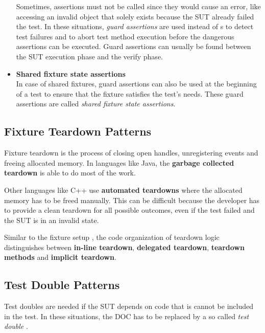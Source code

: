 \begin{itemize}
                        Sometimes, assertions must not be called since they would cause an error, like accessing an invalid object that solely exists because the SUT already failed the test.
                        In these situations, \textit{guard assertions} are used instead of s to detect test failures and to abort test method execution before the dangerous assertions can be executed. 
                        Guard assertions can usually be found between the SUT execution phase and the verify phase. 
                \item \textbf{Shared fixture state assertions}\\
                        In case of shared fixtures, guard assertions can also be used at the beginning of a test to ensure that the fixture satisfies the test's needs.
                        These guard assertions are called \textit{shared fixture state assertions}.
            \end{itemize}

    \subsection{Fixture Teardown Patterns} \label{subsec:FixtureTeardownPatterns}
        Fixture teardown is the process of closing open handles, unregistering events and freeing allocated memory.
        In languages like Java, the \textbf{garbage collected teardown} is able to do most of the work.

        Other languages like C++ use \textbf{automated teardowns} where the allocated memory has to be freed manually.
        This can be difficult because the developer has to provide a clean teardown for all possible outcomes, even if the test failed and the SUT is in an invalid state.

        Similar to the fixture setup , the code organization of teardown logic distinguishes between \textbf{in-line teardown}, \textbf{delegated teardown}, \textbf{teardown methods} and \textbf{implicit teardown}.
        
 

    \subsection{Test Double Patterns} \label{subsec:TestDoublePatterns}
        Test doubles are needed if the SUT depends on code that is cannot be included in the test.
        In these situations, the DOC has to be replaced by a so called \textit{test double} \cite{NirajBhattBlog:TestDoubles}.

